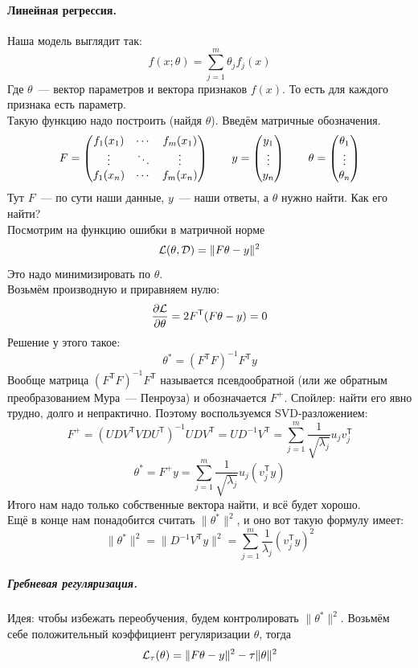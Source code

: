 \documentclass{article}
\begin{document}
    \paragraph{Линейная регрессия.}
    Наша модель выглядит так:
    \[
    f(x;\theta)=\sum\limits_{j=1}^m\theta_jf_j(x)
    \]
    Где $\theta$~--- вектор параметров и вектора признаков $f(x)$. То есть для каждого признака есть параметр.\\
    Такую функцию надо построить (найдя $\theta$). Введём матричные обозначения.
    \[
    F=\left(\begin{matrix}
        f_1(x_1) & \cdots & f_m(x_1)\\
        \vdots & \ddots & \vdots\\
        f_1(x_n) & \cdots & f_m(x_n)
    \end{matrix}\right)
    \qquad
    y=\left(\begin{matrix}y_1\\\vdots\\y_n\end{matrix}\right)
    \qquad
    \theta=\left(\begin{matrix}\theta_1\\\vdots\\\theta_n\end{matrix}\right)
    \]
    Тут $F$~--- по сути наши данные, $y$~--- наши ответы, а $\theta$ нужно найти. Как его найти?\\
    Посмотрим на функцию ошибки в матричной норме
    \[
    {\mathcal{L}}(\theta,{\mathcal{D}})=\|F\theta-y\|^2
    \]
    Это надо минимизировать по $\theta$.\\
    Возьмём производную и приравняем нулю:
    \[
    \frac{\partial{\mathcal{L}}}{\partial\theta}=2F^{\mathsf T}(F\theta-y)=0
    \]
    Решение у этого такое:
    \[
    \theta^*=(F^{\mathsf T}F)^{-1}F^{\mathsf T}y
    \]
    Вообще матрица $(F^{\mathsf T}F)^{-1}F^{\mathsf T}$ называется псевдообратной (или же обратным преобразованием Мура~--- Пенроуза) и обозначается $F^+$. Спойлер: найти его явно трудно, долго и непрактично. Поэтому воспользуемся SVD-разложением:
    \[
    F^+=(UDV^{\mathsf T}VDU^{\mathsf T})^{-1}UDV^{\mathsf T}=UD^{-1}V^{\mathsf T}=\sum\limits_{j=1}^m\frac1{\sqrt{\lambda_j}}u_jv_j^{\mathsf T}
    \]
    \[
    \theta^*=F^+y=\sum\limits_{j=1}^m\frac1{\sqrt{\lambda_j}}u_j(v_j^{\mathsf T}y)
    \]
    Итого нам надо только собственные вектора найти, и всё будет хорошо.\\
    Ещё в конце нам понадобится считать $\|\theta^*\|^2$, и оно вот такую формулу имеет:
    \[
    \|\theta^*\|^2=\|D^{-1}V^{\mathsf T}y\|^2=\sum\limits_{j=1}^m\frac1{\lambda_j}(v_j^{\mathsf T}y)^2
    \]
    \subparagraph{Гребневая регуляризация.}
    Идея: чтобы избежать переобучения, будем контролировать $\|\theta^*\|^2$. Возьмём себе положительный коэффициент регуляризации $\theta$, тогда
    \[
    {\mathcal{L}}_\tau(\theta)=\|F\theta-y\|^2-\tau\|\theta\|^2
    \]
\end{document}

